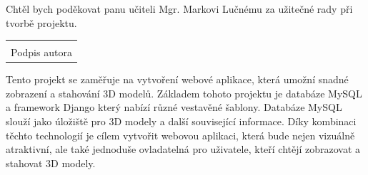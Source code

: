 \documentclass[12pt, a4paper,
twoside,        %
openright
]{report}
\newcommand\datumOdevzdani{1. 1. 2024} %
\begin{document}
\newpage %
	

	\clearpage
	\noindent Chtěl bych poděkovat panu učiteli Mgr. Markovi Lučnému za užitečné rady při tvorbě projektu.
	
	\vspace*{0.7\textheight} %

	\vfill
	\noindent{V Opavě \datumOdevzdani\\}
	\noindent
	\begin{minipage}{\linewidth}
		\hspace{9.5cm} 
		\begin{tabular}{@{}p{6cm}@{}}
			\dotfill \\
			Podpis autora
		\end{tabular}
	\end{minipage}
	
	


	\noindent Tento projekt se zaměřuje na vytvoření webové aplikace, která umožní snadné zobrazení a stahování 3D modelů. Základem tohoto projektu je databáze MySQL a framework Django který nabízí různé vestavěné šablony. Databáze MySQL slouží jako úložiště pro 3D modely a další související informace. Díky kombinaci těchto technologií je cílem vytvořit webovou aplikaci, která bude nejen vizuálně atraktivní, ale také jednoduše ovladatelná pro uživatele, kteří chtějí zobrazovat a stahovat 3D modely. \\
	\vspace{18pt}
	
\end{document}
